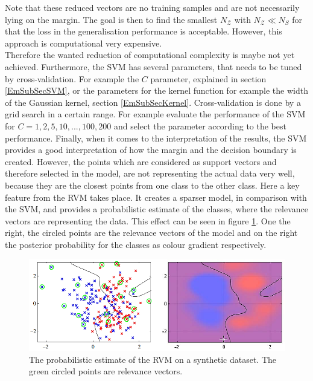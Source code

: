 Note that these reduced vectors are no training samples and are not necessarily lying on the margin.
The goal is then to find the smallest $N_\mathcal{Z}$ with $N_\mathcal{Z} \ll N_S$ for that the loss in the generalisation performance is acceptable.
However, this approach is computational very expensive.\cite{Burges.1997}\\
Therefore the wanted reduction of computational complexity is maybe not yet achieved.\newline
Furthermore, the \ac{SVM} has several parameters, that needs to be tuned by cross-validation.
For example the $C$ parameter, explained in section \ref{EmSubSecSVM}, or the parameters for the kernel function for example the width of the Gaussian kernel, section \ref{EmSubSecKernel}.
Cross-validation is done by a grid search in a certain range.
For example evaluate the performance of the \ac{SVM} for $C={1,2,5,10,...,100,200}$ and select the parameter according to the best performance.\cite{Chen.2009}\newline
Finally, when it comes to the interpretation of the results, the \ac{SVM} provides a good interpretation of how the margin and the decision boundary is created.
However, the points which are considered as support vectors and therefore selected in the model, are not representing the actual data very well, because they are the closest points from one class to the other class.\cite[p. 326]{Bishop.2009}\newline
Here a key feature from the \ac{RVM} takes place. It creates a sparser model, in comparison with the \ac{SVM}, and provides a probabilistic estimate of the classes, where the relevance vectors are representing the data.\cite[p. 335-356]{Bishop.2009}\newline
This effect can be seen in figure \ref{FigRVMProbEst}.
One the right, the circled points are the relevance vectors of the model and on the right the posterior probability for the classes as colour gradient respectively.
\begin{figure}
	\centering
	\includegraphics[width=.8\linewidth]{figures/RVMProbEst.png}
	\caption[Probabilitc Estimate of the RVM]{The probabilistic estimate of the \acs{RVM} on a synthetic dataset. The green circled points are relevance vectors.\cite[p. 356]{Bishop.2009}}
	\label{FigRVMProbEst}
\end{figure}

